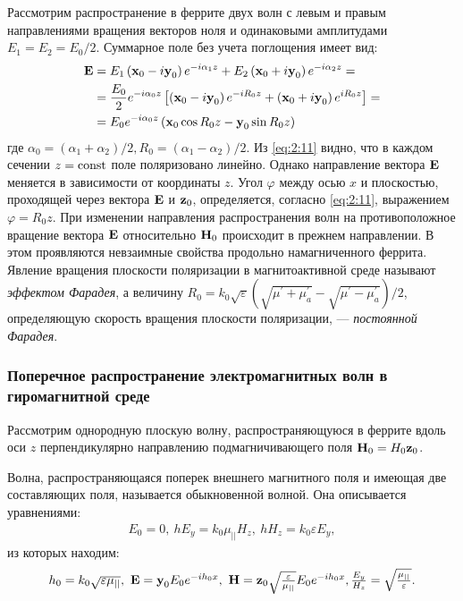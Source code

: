 Рассмотрим распространение в феррите двух волн с левым и правым направлениями вращения векторов ноля и одинаковыми
амплитудами $E_1 = E_2=E_0/2$. Суммарное поле без учета поглощения имеет вид:
\begin{equation}
\begin{aligned} 
    \textbf{E} &=E_{1}\left(\textbf{x}_{0}-i \textbf{y}_{0}\right) e^{-i \alpha_{1} z}+E_{2}\left(\textbf{x}_{0}+i \textbf{y}_{0}\right) e^{-i \alpha_{2} z}=\\
    &=\frac{E_{0}}{2} e^{-i \alpha_{0} z}\left[\left(\textbf{x}_{0}-i \textbf{y}_{0}\right) e^{-i R_{0} z}+\left(\textbf{x}_{0}+i \textbf{y}_{0}\right) e^{i R_{0} z}\right]=\\
    &=E_{0} e^{-i \alpha_{0} z}\left(\textbf{x}_{0} \cos R_{0} z-\textbf{y}_{0} \sin R_{0} z\right)
 \end{aligned}
    \label{eq:2:11}
\end{equation} 
где $\alpha_{0}=\left(\alpha_{1}+\alpha_{2}\right) / 2, R_{0}=\left(\alpha_{1}-\alpha_{2}\right) / 2$. Из \eqref{eq:2:11} видно,
что в каждом сечении $z = \text{\rmfamily\upshape const}$ поле поляризовано линейно. Однако направление вектора $\textbf{E}$ меняется в зависимости от
координаты $z$. Угол $\varphi$ между осью $x$ и плоскостью, проходящей через
вектора $\textbf{E}$ и $\textbf{z}_0$, определяется, согласно \eqref{eq:2:11}, выражением $\varphi=R_{0} z$. При изменении направления распространения волн на
противоположное вращение вектора $\textbf{E}$ относительно $\textbf{H}_0$ происходит в прежнем направлении. В этом проявляются невзаимные
свойства продольно намагниченного феррита. Явление вращения плоскости поляризации в магнитоактивной
среде называют \textit{эффектом Фарадея}, а величину $R_{0}=k_{0}
\sqrt{\varepsilon}(\sqrt{\mu^{\prime}+\mu_{a}^{\prime}}-\sqrt{\mu^{\prime}-\mu_{a}^{\prime}}) / 2$, определяющую
скорость вращения плоскости поляризации, — \textit{постоянной Фарадея}.
\subsubsection{Поперечное распространение электромагнитных волн в гиромагнитной среде}
Рассмотрим однородную плоскую волну, распространяющуюся в феррите вдоль оси $z$ перпендикулярно направлению подмагничивающего поля $\textbf{H}_0=H_0 \textbf{z}_0$. 

Волна, распространяющаяся поперек внешнего магнитного поля и имеющая две составляющих поля, называется обыкновенной волной. Она описывается уравнениями:
\begin{equation}
    \begin{array}
    	{ll}{E_0=0,~ hE_y = k_0\mu_{||}H_z,~ hH_z=k_0\varepsilon E_y}, \end{array}
    \label{eq:2:12}
\end{equation}
из которых находим:
\begin{equation}
    \begin{array}
    	{ll}{h_0=k_0\sqrt{\varepsilon \mu_{||}},~\textbf{E}=\textbf{y}_0 E_0 e^{-ih_0x},~\textbf{H}=\textbf{z}_0 \sqrt{\frac{\varepsilon}{\mu_{||}}} E_0e^{-ih_0x}, \frac{E_y}{H_z}=\sqrt{\frac{\mu_{||}}{\varepsilon}}}. \end{array}
    \label{eq:2:13}
\end{equation}

